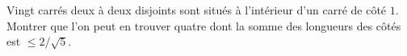 Vingt carrés deux à deux disjoints sont situés à l'intérieur d'un carré de côté $1$. Montrer que l'on peut en trouver quatre dont la somme des longueurs des côtés est $\leq 2/\sqrt{5}$.
